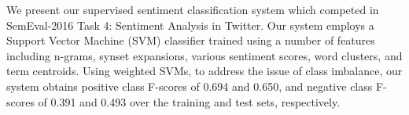 We present our supervised sentiment classification system which competed in SemEval-2016 Task 4: Sentiment Analysis in Twitter. Our system employs a Support Vector Machine (SVM) classifier trained using a number of features including n-grams, synset expansions, various sentiment scores, word clusters, and term centroids. Using weighted SVMs, to address the issue of class imbalance, our system obtains positive class F-scores of 0.694 and 0.650, and negative class F-scores of 0.391 and 0.493 over the training and test sets, respectively.
